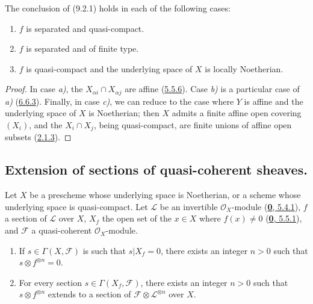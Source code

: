 \begin{corollary}[9.2.2]
\label{I.9.2.2}
The conclusion of (9.2.1) holds in each of the following cases:
\begin{enumerate}
\item[\textup{a)}] $f$ is separated and quasi-compact.
\item[\textup{b)}] $f$ is separated and of finite type.
\item[\textup{c)}] $f$ is quasi-compact and the underlying space of $X$ is locally
Noetherian.
\end{enumerate}
\end{corollary}

\begin{proof}
In case \emph{a)}, the $X_{\alpha i}\cap X_{\alpha j}$ are affine
(\hyperref[I.5.5.6]{5.5.6}). Case \emph{b)} is a particular case of \emph{a)}
(\hyperref[I.6.6.3]{6.6.3}). Finally, in case \emph{c)}, we can reduce to the
case where $Y$ is affine and the underlying space of $X$ is Noetherian; then
$X$ admits a finite affine open covering $(X_i)$, and the $X_i\cap X_j$,
being quasi-compact, are finite unions of affine open subsets
(\hyperref[I.2.1.3]{2.1.3}).
\end{proof}

\subsection{Extension of sections of quasi-coherent sheaves.}
\label{subsection:I.9.3}

\begin{theorem}[9.3.1]
\label{I.9.3.1}
Let $X$ be a prescheme whose underlying space is Noetherian, or a scheme
whose underlying space is quasi-compact. Let $\mathscr{L}$ be an invertible
$\mathscr{O}_X$-module
\textup{(\hyperref[0.5.4.1]{\textbf{0}, 5.4.1})}, $f$ a section of $\mathscr{L}$ over
$X$, $X_f$ the open set of the $x\in X$ where $f(x)\neq0$
\textup{(\hyperref[0.5.5.1]{\textbf{0}, 5.5.1})}, and $\mathscr{F}$ a quasi-coherent
$\mathscr{O}_X$-module.
\begin{enumerate}
\item[\textup{(i)}] If $s\in\Gamma(X,\mathscr{F})$ is such that $s|X_f=0$, there exists
an integer $n>0$ such that $s\otimes f^{\otimes n}=0$.
\item[\textup{(ii)}] For every section $s\in\Gamma(X_f,\mathscr{F})$, there exists an
integer $n>0$ such that $s\otimes f^{\otimes n}$ extends to a section of
$\mathscr{F}\otimes\mathscr{L}^{\otimes n}$ over $X$.
\end{enumerate}
\end{theorem}

